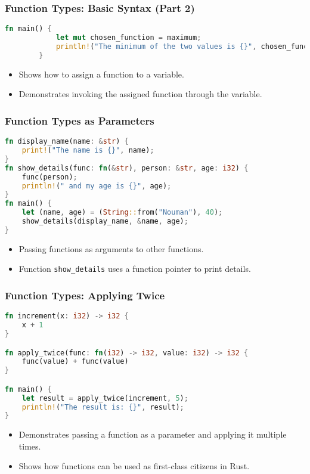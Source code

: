 \documentclass[aspectratio=169, table]{beamer}
\begin{document}
\begin{frame}[fragile]
	\frametitle{Function Types: Basic Syntax (Part 2)}
	\begin{lstlisting}[language=Rust]
		fn main() {
			let mut chosen_function = maximum;
			println!("The minimum of the two values is {}", chosen_function(2, 3));
		}
	\end{lstlisting}
	\begin{itemize}
		\item Shows how to assign a function to a variable.
		\item Demonstrates invoking the assigned function through the variable.
	\end{itemize}
\end{frame}


\begin{frame}[fragile]
\frametitle{Function Types as Parameters}
\begin{lstlisting}[language=Rust]
fn display_name(name: &str) {
	print!("The name is {}", name); 
}
fn show_details(func: fn(&str), person: &str, age: i32) {
	func(person); 
	println!(" and my age is {}", age);
}
fn main() {
	let (name, age) = (String::from("Nouman"), 40); 
	show_details(display_name, &name, age);
}
\end{lstlisting}
\begin{itemize}
\item Passing functions as arguments to other functions.
\item Function \texttt{show\_details} uses a function pointer to print details.
\end{itemize}
\end{frame}

\begin{frame}[fragile]
\frametitle{Function Types: Applying Twice}
\vspace{15pt}
\begin{lstlisting}[language=Rust]
fn increment(x: i32) -> i32 {
	x + 1
}

fn apply_twice(func: fn(i32) -> i32, value: i32) -> i32 {
	func(value) + func(value)
}

fn main() {
	let result = apply_twice(increment, 5);
	println!("The result is: {}", result);
}
\end{lstlisting}
\begin{itemize}
\item Demonstrates passing a function as a parameter and applying it multiple times.
\item Shows how functions can be used as first-class citizens in Rust.
\end{itemize}
\end{frame}
\end{document}
